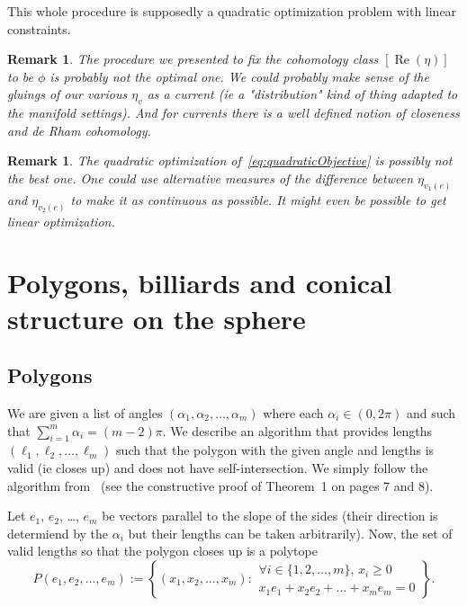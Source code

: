\documentclass[a4paper,12pt]{article}
\def\Re{\operatorname{Re}}
\newtheorem{remark}[definition]{Remark}
\begin{document}
This whole procedure is supposedly a quadratic optimization problem with
linear constraints.

\begin{remark}
The procedure we presented to fix the cohomology class $[\Re(\eta)]$ to be
$\phi$ is probably not the optimal one. We could probably make sense of the
gluings of our various $\eta_v$ as a \emph{current} (ie a "distribution" kind
of thing adapted to the manifold settings). And for currents there is a well
defined notion of closeness and de Rham cohomology.
\end{remark}

\begin{remark}
The quadratic optimization of~\eqref{eq:quadraticObjective} is possibly not
the best one. One could use alternative measures of the difference between
$\eta_{v_1(e)}$ and $\eta_{v_2(e)}$ to make it as continuous as possible. It
might even be possible to get linear optimization.
\end{remark}

\section{Polygons, billiards and conical structure on the sphere}

\subsection{Polygons}
We are given a list of angles $(\alpha_1, \alpha_2, \ldots, \alpha_m)$ where each
$\alpha_i \in (0,2\pi)$ and such that $\sum_{i=1}^m \alpha_i = (m-2) \pi$. We describe
an algorithm that provides lengths $(\ell_1, \ell_2, \ldots, \ell_m)$ such that
the polygon with the given angle and lengths is valid (ie closes up) and does not have
self-intersection. We simply follow the algorithm from~\cite{EfratFulekKobourovToth} (see the constructive proof of Theorem~1 on pages 7 and 8).

Let $e_1$, $e_2$, \ldots, $e_m$ be vectors parallel to the slope of the sides
(their direction is determiend by the $\alpha_i$ but their lengths can be taken
arbitrarily). Now, the set of valid lengths so that the polygon closes up is a
polytope
\[
P(e_1, e_2, \ldots, e_m) := \left\{(x_1, x_2, \ldots, x_m):
\begin{array}{l}
\forall i \in \{1,2,\ldots,m\},\, x_i \geq 0 \\
x_1 e_1 + x_2 e_2 + \ldots + x_m e_m = 0
\end{array}
\right\}.
\]
\end{document}
